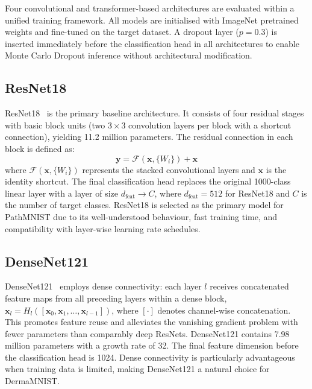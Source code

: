 Four convolutional and transformer-based architectures are evaluated within a unified training framework. All models are initialised with ImageNet pretrained weights and fine-tuned on the target dataset. A dropout layer ($p = 0.3$) is inserted immediately before the classification head in all architectures to enable Monte Carlo Dropout inference without architectural modification.

\subsection{ResNet18}

ResNet18~\cite{he2016deep} is the primary baseline architecture. It consists of four residual stages with basic block units (two $3 \times 3$ convolution layers per block with a shortcut connection), yielding 11.2 million parameters. The residual connection in each block is defined as:
\begin{equation}
    \mathbf{y} = \mathcal{F}(\mathbf{x}, \{W_i\}) + \mathbf{x}
\end{equation}
where $\mathcal{F}(\mathbf{x}, \{W_i\})$ represents the stacked convolutional layers and $\mathbf{x}$ is the identity shortcut. The final classification head replaces the original 1000-class linear layer with a layer of size $d_{\text{feat}} \to C$, where $d_{\text{feat}} = 512$ for ResNet18 and $C$ is the number of target classes. ResNet18 is selected as the primary model for PathMNIST due to its well-understood behaviour, fast training time, and compatibility with layer-wise learning rate schedules.

\subsection{DenseNet121}

DenseNet121~\cite{huang2017densely} employs dense connectivity: each layer $l$ receives concatenated feature maps from all preceding layers within a dense block, $\mathbf{x}_l = H_l([\mathbf{x}_0, \mathbf{x}_1, \ldots, \mathbf{x}_{l-1}])$, where $[\cdot]$ denotes channel-wise concatenation. This promotes feature reuse and alleviates the vanishing gradient problem with fewer parameters than comparably deep ResNets. DenseNet121 contains 7.98 million parameters with a growth rate of 32. The final feature dimension before the classification head is 1024. Dense connectivity is particularly advantageous when training data is limited, making DenseNet121 a natural choice for DermaMNIST.

